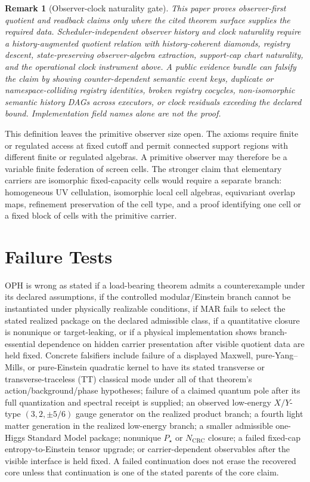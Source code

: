 \documentclass[11pt]{article}
\newtheorem{remark}[theorem]{Remark}
\begin{document}
\begin{remark}[Observer-clock naturality gate]\label{rem:observer-clock-naturality-gate}
This paper proves observer-first quotient and readback claims only where the cited theorem
surface supplies the required data. Scheduler-independent observer history and clock naturality
require a history-augmented quotient relation with history-coherent diamonds, registry descent,
state-preserving observer-algebra extraction, support-cap chart naturality, and the operational
clock instrument above. A public evidence bundle can falsify the claim by showing counter-dependent
semantic event keys, duplicate or namespace-colliding registry identities, broken registry
cocycles, non-isomorphic semantic history DAGs across executors, or clock residuals exceeding the
declared bound. Implementation field names alone are not the proof.
\end{remark}

This definition leaves the primitive observer size open. The axioms require finite or regulated
access at fixed cutoff and permit connected support regions with different finite or regulated
algebras. A primitive observer may therefore be a variable finite federation of screen cells. The
stronger claim that elementary carriers are isomorphic fixed-capacity cells would require a separate
branch: homogeneous UV cellulation, isomorphic local cell algebras, equivariant overlap maps,
refinement preservation of the cell type, and a proof identifying one cell or a fixed block of cells
with the primitive carrier.

\section*{Failure Tests}

OPH is wrong as stated if a load-bearing theorem admits a counterexample under its declared
assumptions, if the controlled modular/Einstein branch cannot be instantiated under physically
realizable conditions, if MAR fails to select the stated realized package on the declared
admissible class, if a quantitative closure is nonunique or target-leaking, or if a physical
implementation shows branch-essential dependence on hidden carrier presentation after visible
quotient data are held fixed. Concrete falsifiers include failure of a displayed Maxwell,
pure-Yang--Mills, or pure-Einstein quadratic kernel to have its stated transverse or transverse-traceless (TT) classical
mode under all of that theorem's action/background/phase hypotheses; failure of a claimed quantum
pole after its full quantization and spectral receipt is supplied; an observed
low-energy \(X/Y\)-type \((3,2,\pm5/6)\) gauge generator on the realized
product branch; a fourth
light matter generation in the realized low-energy branch; a smaller admissible one-Higgs Standard
Model package; nonunique \(P_\star\) or \(N_{\mathrm{CRC}}\) closure; a failed fixed-cap
entropy-to-Einstein tensor upgrade; or carrier-dependent observables after the visible interface is
held fixed. A failed continuation does not erase the recovered core unless that continuation is one
of the stated parents of the core claim.
	
\end{document}
